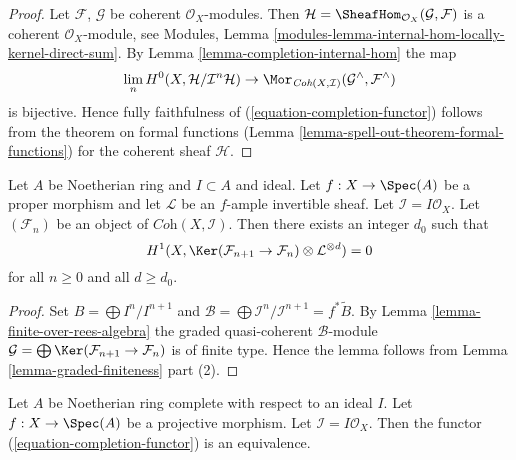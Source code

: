 \begin{proof}
Let $\mathcal{F}$, $\mathcal{G}$ be coherent $\mathcal{O}_X$-modules.
Then $\mathcal{H} = \SheafHom_{\mathcal{O}_X}(\mathcal{G}, \mathcal{F})$
is a coherent $\mathcal{O}_X$-module, see
Modules, Lemma \ref{modules-lemma-internal-hom-locally-kernel-direct-sum}.
By Lemma \ref{lemma-completion-internal-hom} the map
$$
\lim_n H^0(X, \mathcal{H}/\mathcal{I}^n\mathcal{H})
\to
\Mor_{\textit{Coh}(X, \mathcal{I})}
(\mathcal{G}^\wedge, \mathcal{F}^\wedge)
$$
is bijective. Hence fully faithfulness of
(\ref{equation-completion-functor}) follows from the theorem on formal
functions (Lemma \ref{lemma-spell-out-theorem-formal-functions})
for the coherent sheaf $\mathcal{H}$.
\end{proof}

\begin{lemma}
\label{lemma-vanishing-projective}
Let $A$ be Noetherian ring and $I \subset A$ and ideal.
Let $f : X \to \Spec(A)$ be a proper morphism and let
$\mathcal{L}$ be an $f$-ample invertible sheaf. Let
$\mathcal{I} = I\mathcal{O}_X$. Let $(\mathcal{F}_n)$ be an
object of $\textit{Coh}(X, \mathcal{I})$. Then there exists an
integer $d_0$ such that
$$
H^1(X, \Ker(\mathcal{F}_{n + 1} \to \mathcal{F}_n)
\otimes \mathcal{L}^{\otimes d} )
= 0
$$
for all $n \geq 0$ and all $d \geq d_0$.
\end{lemma}

\begin{proof}
Set $B = \bigoplus I^n/I^{n + 1}$ and
$\mathcal{B} = \bigoplus \mathcal{I}^n/\mathcal{I}^{n + 1} = f^*\widetilde{B}$.
By Lemma \ref{lemma-finite-over-rees-algebra} the graded quasi-coherent
$\mathcal{B}$-module
$\mathcal{G} = \bigoplus \Ker(\mathcal{F}_{n + 1} \to \mathcal{F}_n)$
is of finite type. Hence the lemma follows from
Lemma \ref{lemma-graded-finiteness} part (2).
\end{proof}

\begin{lemma}
\label{lemma-existence-projective}
Let $A$ be Noetherian ring complete with respect to an ideal $I$.
Let $f : X \to \Spec(A)$ be a projective morphism. Let
$\mathcal{I} = I\mathcal{O}_X$.
Then the functor (\ref{equation-completion-functor}) is an equivalence.
\end{lemma}

